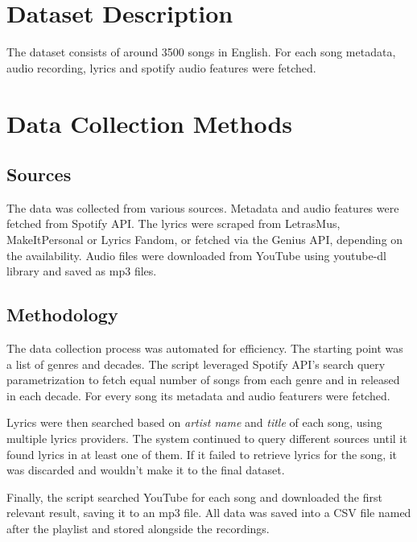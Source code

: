 
\section{Dataset Description}
\label{sec:datasetdescription}

The dataset consists of around 3500 songs in English. For each song metadata, audio
recording, lyrics and spotify audio features were fetched.

\section{Data Collection Methods}
\label{sec:datacollectionmethods}

\subsection{Sources}
The data was collected from various sources. Metadata and audio features were
fetched from Spotify API\cite{spotify_api}. The lyrics were scraped from
LetrasMus\cite{letras_mus}, MakeItPersonal\cite{makeitpersonal} or Lyrics
Fandom\cite{lyricsfandom}, or fetched via the Genius API\cite{genius},
depending on the availability. Audio files were downloaded from YouTube using
youtube-dl\cite{ytdl} library and saved as mp3 files.

\subsection{Methodology}
The data collection process was automated for efficiency. The starting point
was a list of genres and decades. The script leveraged Spotify API's search
query parametrization to fetch equal number of songs from each genre and in
released in  each decade. For every song its metadata and audio featurers were
fetched.

Lyrics were then searched based on \textit{artist name} and \textit{title} of
each song, using multiple lyrics providers. The system continued to query
different sources until it found lyrics in at least one of them. If it failed
to retrieve lyrics for the song, it was discarded and wouldn't make it to the
final dataset.

Finally, the script  searched YouTube for each song and downloaded the first
relevant result, saving it to an mp3 file. All data was saved into a CSV
file named after the playlist and stored alongside the recordings.

